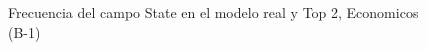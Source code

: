 \begin{figure}[H]
    \centering
    
    \caption{Frecuencia del campo State en el modelo real y Top 2, Economicos (B-1)}
    \label{frecuency-State-top2}
\end{figure}